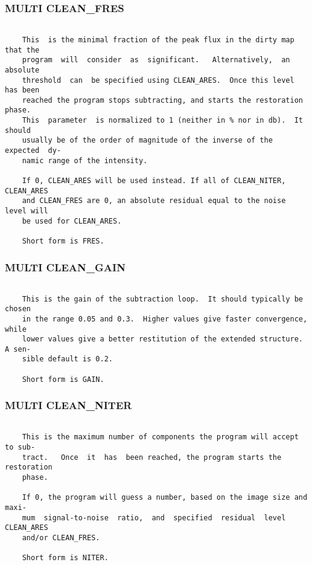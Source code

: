 \subsubsection{MULTI CLEAN\_FRES}
\begin{verbatim}

    This  is the minimal fraction of the peak flux in the dirty map that the
    program  will  consider  as  significant.   Alternatively,  an  absolute
    threshold  can  be specified using CLEAN_ARES.  Once this level has been
    reached the program stops subtracting, and starts the restoration phase.
    This  parameter  is normalized to 1 (neither in % nor in db).  It should
    usually be of the order of magnitude of the inverse of the expected  dy-
    namic range of the intensity.

    If 0, CLEAN_ARES will be used instead. If all of CLEAN_NITER, CLEAN_ARES
    and CLEAN_FRES are 0, an absolute residual equal to the noise level will
    be used for CLEAN_ARES.

    Short form is FRES.

\end{verbatim}
\subsubsection{MULTI CLEAN\_GAIN}
\begin{verbatim}

    This is the gain of the subtraction loop.  It should typically be chosen
    in the range 0.05 and 0.3.  Higher values give faster convergence, while
    lower values give a better restitution of the extended structure. A sen-
    sible default is 0.2.

    Short form is GAIN.

\end{verbatim}
\subsubsection{MULTI CLEAN\_NITER}
\begin{verbatim}

    This is the maximum number of components the program will accept to sub-
    tract.   Once  it  has  been reached, the program starts the restoration
    phase.

    If 0, the program will guess a number, based on the image size and maxi-
    mum  signal-to-noise  ratio,  and  specified  residual  level CLEAN_ARES
    and/or CLEAN_FRES.

    Short form is NITER.

\end{verbatim}
